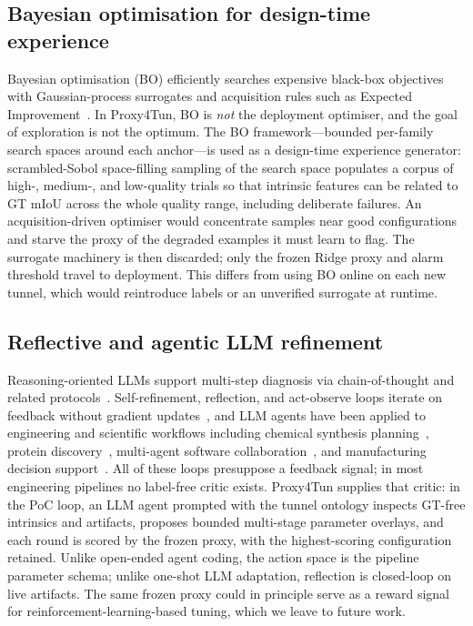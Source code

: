 \documentclass[a4paper,fleqn]{cas-dc}
\begin{document}
\subsection{Bayesian optimisation for design-time experience}

Bayesian optimisation (BO) efficiently searches expensive black-box objectives with Gaussian-process surrogates and acquisition rules such as Expected Improvement~\cite{mockus1978bayesian,jones1998ego,rasmussen2006gpml,snoek2012practicalBO,shahriari2016reviewBO,frazier2018tutorialBO,garnett2023bayesianOptimization}. In Proxy4Tun, BO is \emph{not} the deployment optimiser, and the goal of exploration is not the optimum. The BO framework---bounded per-family search spaces around each anchor---is used as a design-time experience generator: scrambled-Sobol space-filling sampling of the search space populates a corpus of high-, medium-, and low-quality trials so that intrinsic features can be related to GT mIoU across the whole quality range, including deliberate failures. An acquisition-driven optimiser would concentrate samples near good configurations and starve the proxy of the degraded examples it must learn to flag. The surrogate machinery is then discarded; only the frozen Ridge proxy and alarm threshold travel to deployment. This differs from using BO online on each new tunnel, which would reintroduce labels or an unverified surrogate at runtime.

\subsection{Reflective and agentic LLM refinement}

Reasoning-oriented LLMs support multi-step diagnosis via chain-of-thought and related protocols~\cite{wei2023cot,kojima2023zeroshot,xiang2025metacot}. Self-refinement, reflection, and act-observe loops iterate on feedback without gradient updates~\cite{madaan2023selfrefine,shinn2023reflexion,yao2023react,ferraz2024llm}, and LLM agents have been applied to engineering and scientific workflows including chemical synthesis planning~\cite{bran2024chemcrow}, protein discovery~\cite{ghafarollahi2024protagents}, multi-agent software collaboration~\cite{qian2024chatdev,hong2024metagpt}, and manufacturing decision support~\cite{garcia2024manufacturing}. All of these loops presuppose a feedback signal; in most engineering pipelines no label-free critic exists. Proxy4Tun supplies that critic: in the PoC loop, an LLM agent prompted with the tunnel ontology inspects GT-free intrinsics and artifacts, proposes bounded multi-stage parameter overlays, and each round is scored by the frozen proxy, with the highest-scoring configuration retained. Unlike open-ended agent coding, the action space is the pipeline parameter schema; unlike one-shot LLM adaptation, reflection is closed-loop on live artifacts. The same frozen proxy could in principle serve as a reward signal for reinforcement-learning-based tuning, which we leave to future work.
\end{document}
